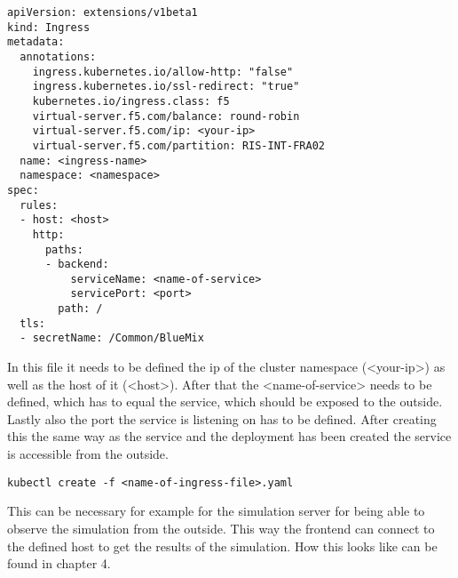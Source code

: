 \begin{lstlisting}
apiVersion: extensions/v1beta1
kind: Ingress
metadata:
  annotations:
    ingress.kubernetes.io/allow-http: "false"
    ingress.kubernetes.io/ssl-redirect: "true"
    kubernetes.io/ingress.class: f5
    virtual-server.f5.com/balance: round-robin
    virtual-server.f5.com/ip: <your-ip>
    virtual-server.f5.com/partition: RIS-INT-FRA02
  name: <ingress-name>
  namespace: <namespace>
spec:
  rules:
  - host: <host>
    http:
      paths:
      - backend:
          serviceName: <name-of-service>
          servicePort: <port>
        path: /
  tls:
  - secretName: /Common/BlueMix
\end{lstlisting}

In this file it needs to be defined the ip of the cluster namespace (<your-ip>) as well as the host of it (<host>). After that the <name-of-service> needs to be defined, which has to equal the service, which should be exposed to the outside. Lastly also the port the service is listening on has to be defined. After creating this the same way as the service and the deployment has been created the service is accessible from the outside.

\begin{lstlisting}
kubectl create -f <name-of-ingress-file>.yaml
\end{lstlisting}

This can be necessary for example for the simulation server for being able to observe the simulation from the outside. This way the frontend can connect to the defined host to get the results of the simulation. How this looks like can be found in chapter 4.



